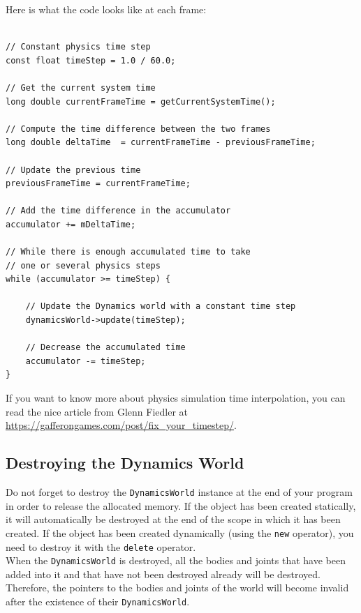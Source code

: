 \documentclass[a4paper,12pt]{article}
\begin{document}
    Here is what the code looks like at each frame: \\

    \begin{lstlisting}

// Constant physics time step
const float timeStep = 1.0 / 60.0;

// Get the current system time
long double currentFrameTime = getCurrentSystemTime();

// Compute the time difference between the two frames
long double deltaTime  = currentFrameTime - previousFrameTime;

// Update the previous time
previousFrameTime = currentFrameTime;

// Add the time difference in the accumulator
accumulator += mDeltaTime;

// While there is enough accumulated time to take
// one or several physics steps
while (accumulator >= timeStep) {

    // Update the Dynamics world with a constant time step
    dynamicsWorld->update(timeStep);

    // Decrease the accumulated time
    accumulator -= timeStep;
}

    \end{lstlisting}

    \vspace{0.6cm}

    If you want to know more about physics simulation time interpolation, you can read the nice article from Glenn Fiedler at \url{https://gafferongames.com/post/fix_your_timestep/}.

    \subsection{Destroying the Dynamics World}

    Do not forget to destroy the \texttt{DynamicsWorld} instance at the end of your program in order to release the allocated memory. If the object has been created
    statically, it will automatically be destroyed at the end of the scope in which it has been created. If the object has been created dynamically (using the
    \texttt{new} operator), you need to destroy it with the \texttt{delete} operator. \\

    When the \texttt{DynamicsWorld} is destroyed, all the bodies and joints that have been added into it and that have not been destroyed already will be destroyed.
    Therefore, the pointers to the bodies and joints of the world will become invalid after the existence of their \texttt{DynamicsWorld}.
\end{document}
